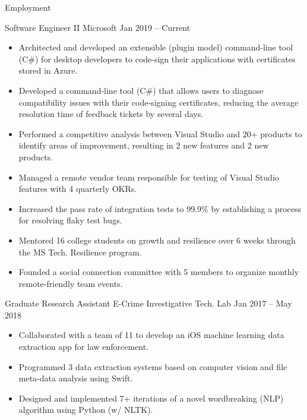 \documentclass[]{mcdowellcv}
\begin{document}
	\makeheader
	
	\begin{cvsection}{Employment}
		\begin{cvsubsection} {Software Engineer II} {Microsoft} {Jan 2019 -- Current}
			\begin{itemize}
				\item Architected and developed an extensible (plugin model) command-line tool (C\#) for desktop developers to code-sign their applications with certificates stored in Azure.			
				\item Developed a command-line tool (C\#) that allows users to diagnose compatibility issues with their code-signing certificates, reducing the average resolution time of feedback tickets by several days.		
				\item Performed a competitive analysis between Visual Studio and 20+ products to identify areas of improvement, resulting in 2 new features and 2 new products.	
				\item Managed a remote vendor team responsible for testing of Visual Studio features with 4 quarterly OKRs.
				\item Increased the pass rate of integration tests to 99.9\% by establishing a process for resolving flaky test bugs.	
				\item Mentored 16 college students on growth and resilience over 6 weeks through the MS Tech. Resilience program.
				\item Founded a social connection committee with 5 members to organize monthly remote-friendly team events.
			\end{itemize}
		\end{cvsubsection}

		\begin{cvsubsection} {Graduate Research Assistant} {E-Crime Investigative Tech. Lab} {Jan 2017 -- May 2018}
			\begin{itemize}
				\item Collaborated with a team of 11 to develop an iOS machine learning data extraction app for law enforcement.
				\item Programmed 3 data extraction systems based on computer vision and file meta-data analysis using Swift.
				\item Designed and implemented 7+ iterations of a novel wordbreaking (NLP) algorithm using Python (w/ NLTK).
			\end{itemize}
		\end{cvsubsection}
		

\end{cvsection}
\end{document}
